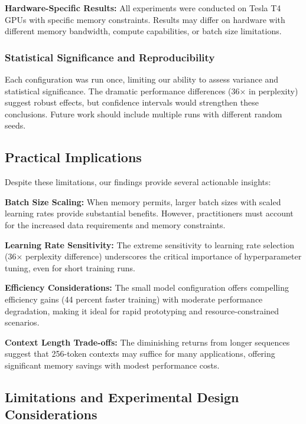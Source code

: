 \documentclass[11pt,a4paper]{article}
\begin{document}
\textbf{Hardware-Specific Results:} All experiments were conducted on Tesla T4 GPUs with specific memory constraints. Results may differ on hardware with different memory bandwidth, compute capabilities, or batch size limitations.

\subsubsection{Statistical Significance and Reproducibility}
Each configuration was run once, limiting our ability to assess variance and statistical significance. The dramatic performance differences (36× in perplexity) suggest robust effects, but confidence intervals would strengthen these conclusions. Future work should include multiple runs with different random seeds.

\subsection{Practical Implications}
Despite these limitations, our findings provide several actionable insights:

\textbf{Batch Size Scaling:} When memory permits, larger batch sizes with scaled learning rates provide substantial benefits. However, practitioners must account for the increased data requirements and memory constraints.

\textbf{Learning Rate Sensitivity:} The extreme sensitivity to learning rate selection (36× perplexity difference) underscores the critical importance of hyperparameter tuning, even for short training runs.

\textbf{Efficiency Considerations:} The small model configuration offers compelling efficiency gains (44 percent faster training) with moderate performance degradation, making it ideal for rapid prototyping and resource-constrained scenarios.

\textbf{Context Length Trade-offs:} The diminishing returns from longer sequences suggest that 256-token contexts may suffice for many applications, offering significant memory savings with modest performance costs.

\subsection{Limitations and Experimental Design Considerations}
\end{document}
